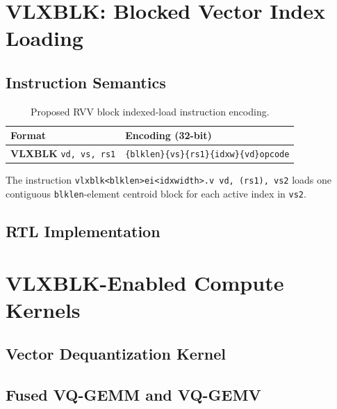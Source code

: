 \documentclass[conference]{IEEEtran}
\begin{document}
\section{VLXBLK: Blocked Vector Index Loading}

\subsection{Instruction Semantics}



\begin{table}[t]
\centering
\caption{Proposed RVV block indexed-load instruction encoding.}
\label{tab:vlxblk_encoding}
\scriptsize
\setlength{\tabcolsep}{4pt}
\begin{tabular}{@{}ll@{}}
\hline
\textbf{Format} & \textbf{Encoding (32-bit)} \\
\hline
\textbf{VLXBLK} \texttt{vd, vs, rs1} &
\texttt{\{blklen\}\{vs\}\{rs1\}\{idxw\}\{vd\}opcode} \\
\hline
\end{tabular}
\end{table}
The instruction \texttt{vlxblk<blklen>ei<idxwidth>.v vd, (rs1), vs2}
loads one contiguous \texttt{blklen}-element centroid block for each active
index in \texttt{vs2}.





\subsection{RTL Implementation}


\section{VLXBLK-Enabled Compute Kernels}
  \subsection{Vector Dequantization Kernel}
  
  \subsection{Fused VQ-GEMM and VQ-GEMV}
\end{document}
